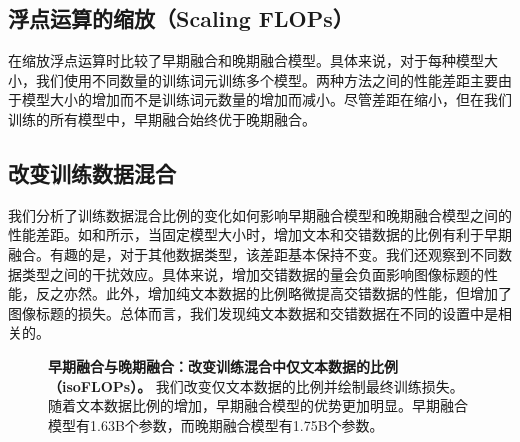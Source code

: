 \subsection{浮点运算的缩放（Scaling FLOPs）}  在缩放浮点运算时比较了早期融合和晚期融合模型。具体来说，对于每种模型大小，我们使用不同数量的训练词元训练多个模型。两种方法之间的性能差距主要由于模型大小的增加而不是训练词元数量的增加而减小。尽管差距在缩小，但在我们训练的所有模型中，早期融合始终优于晚期融合。




\subsection{改变训练数据混合} 我们分析了训练数据混合比例的变化如何影响早期融合模型和晚期融合模型之间的性能差距。如和所示，当固定模型大小时，增加文本和交错数据的比例有利于早期融合。有趣的是，对于其他数据类型，该差距基本保持不变。我们还观察到不同数据类型之间的干扰效应。具体来说，增加交错数据的量会负面影响图像标题的性能，反之亦然。此外，增加纯文本数据的比例略微提高交错数据的性能，但增加了图像标题的损失。总体而言，我们发现纯文本数据和交错数据在不同的设置中是相关的。



    









\begin{figure}[htp]
    \centering
    \captionsetup{type=figure}
    \begin{subfigure}[t]{0.33\linewidth}
        
    \end{subfigure}
    \begin{subfigure}[t]{0.32\linewidth}
        
    \end{subfigure}
    \begin{subfigure}[t]{0.32\linewidth}
        
    \end{subfigure}
            
    \vspace{0.3cm}
    \caption{\textbf{早期融合与晚期融合：改变训练混合中仅文本数据的比例（isoFLOPs）。} 我们改变仅文本数据的比例并绘制最终训练损失。随着文本数据比例的增加，早期融合模型的优势更加明显。早期融合模型有1.63B个参数，而晚期融合模型有1.75B个参数。}
    \label{fig:early_vs_late_textratio}
\end{figure}

